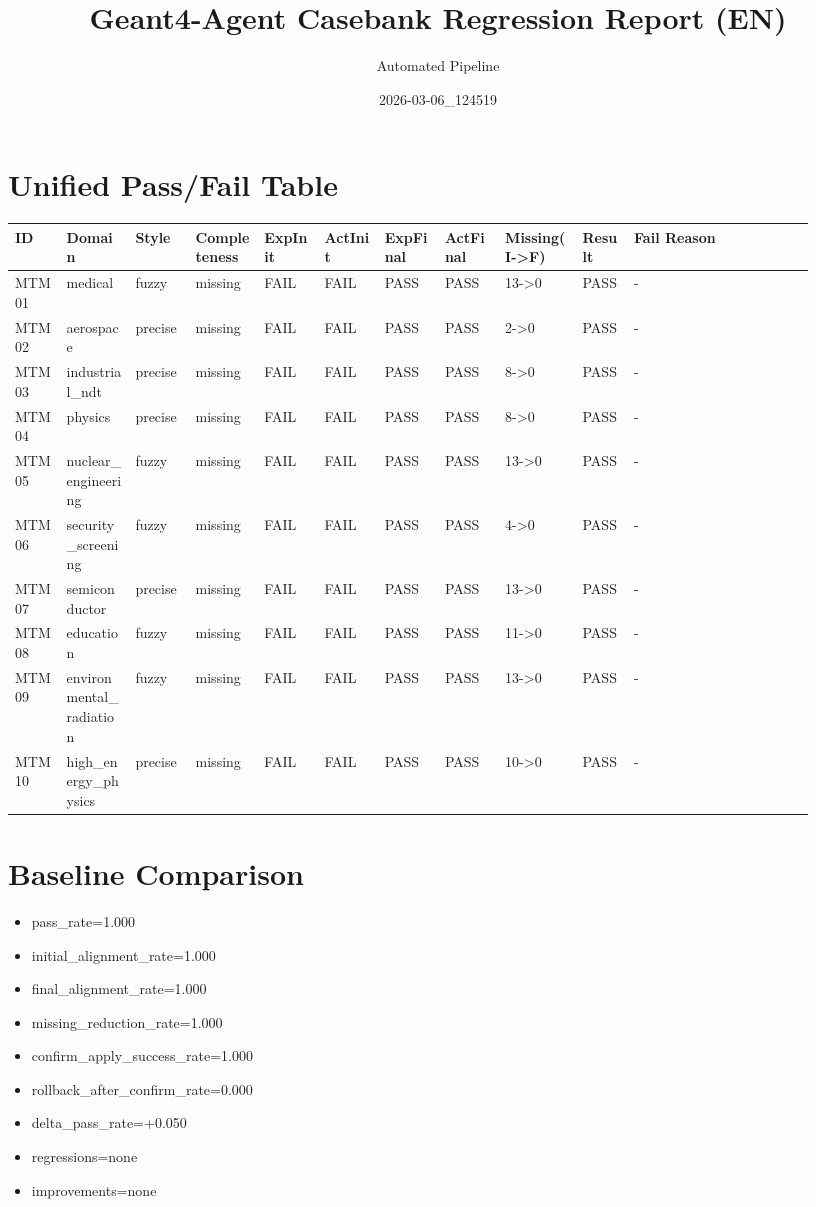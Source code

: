 \documentclass[11pt]{ctexart}
\title{Geant4-Agent Casebank Regression Report (EN)}
\author{Automated Pipeline}
\date{2026-03-06\_124519}
\begin{document}
\maketitle
\section{Unified Pass/Fail Table}
\begin{longtable}{p{0.06\linewidth}p{0.08\linewidth}p{0.07\linewidth}p{0.08\linewidth}p{0.07\linewidth}p{0.07\linewidth}p{0.07\linewidth}p{0.07\linewidth}p{0.09\linewidth}p{0.06\linewidth}p{0.21\linewidth}}
\toprule
ID & Domain & Style & Completeness & ExpInit & ActInit & ExpFinal & ActFinal & Missing(I->F) & Result & Fail Reason \\
\midrule
MTM01 & medical & fuzzy & missing & FAIL & FAIL & PASS & PASS & 13->0 & PASS & - \\
MTM02 & aerospace & precise & missing & FAIL & FAIL & PASS & PASS & 2->0 & PASS & - \\
MTM03 & industrial\_ndt & precise & missing & FAIL & FAIL & PASS & PASS & 8->0 & PASS & - \\
MTM04 & physics & precise & missing & FAIL & FAIL & PASS & PASS & 8->0 & PASS & - \\
MTM05 & nuclear\_engineering & fuzzy & missing & FAIL & FAIL & PASS & PASS & 13->0 & PASS & - \\
MTM06 & security\_screening & fuzzy & missing & FAIL & FAIL & PASS & PASS & 4->0 & PASS & - \\
MTM07 & semiconductor & precise & missing & FAIL & FAIL & PASS & PASS & 13->0 & PASS & - \\
MTM08 & education & fuzzy & missing & FAIL & FAIL & PASS & PASS & 11->0 & PASS & - \\
MTM09 & environmental\_radiation & fuzzy & missing & FAIL & FAIL & PASS & PASS & 13->0 & PASS & - \\
MTM10 & high\_energy\_physics & precise & missing & FAIL & FAIL & PASS & PASS & 10->0 & PASS & - \\
\bottomrule
\end{longtable}
\section{Baseline Comparison}
\begin{itemize}
\item pass\_rate=1.000
\item initial\_alignment\_rate=1.000
\item final\_alignment\_rate=1.000
\item missing\_reduction\_rate=1.000
\item confirm\_apply\_success\_rate=1.000
\item rollback\_after\_confirm\_rate=0.000
\item delta\_pass\_rate=+0.050
\item regressions=none
\item improvements=none
\end{itemize}
\appendix
\end{document}
